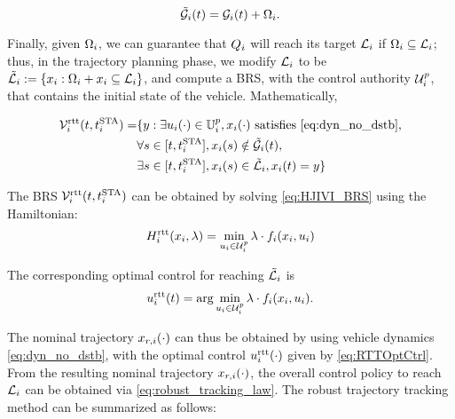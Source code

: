 \begin{equation} 
\label{eqn:rttAugObs}
\tilde{\obsset}_i(t) = \obsset_i(t) + \disckernel_i.
\end{equation}

Finally, given $\Omega_i$, we can guarantee that $Q_i$ will reach its target $\mathcal{L}_i$ if $\Omega_i \subseteq \mathcal{L}_i$; thus, in the trajectory planning phase, we modify $\mathcal{L}_i$ to be $\tilde{\mathcal{L}}_i := \{x_i: \Omega_i + x_i \subseteq \mathcal{L}_i\}$, and compute a BRS, with the control authority $\mathcal{U}^p_i$, that contains the initial state of the vehicle. Mathematically,

\begin{equation}
\label{eq:rttBRS}
\begin{aligned}
\brs_i^\text{rtt}(t, \sta_i) = & \{y: \exists \ctrl_i(\cdot) \in \cfset^p_i, \state_i(\cdot) \text{ satisfies \eqref{eq:dyn_no_dstb}},\\
&\forall s \in [t, \sta_i], \state_i(s) \notin \tilde{\obsset}_i(t), \\
& \exists s \in [t, \sta_i], \state_i(s) \in \tilde{\targetset}_i, \state_i(t) = y\}
\end{aligned}
\end{equation}

The BRS $\mathcal{V}_i^\text{rtt}(t, t^\text{STA}_i)$ can be obtained by solving \eqref{eq:HJIVI_BRS} using the Hamiltonian: 
\begin{equation}
\label{eq:RTTham}
\ham_i^\text{rtt}(\state_i, \costate) = \min_{\ctrl_i \in \cset^\pos_i } \costate \cdot \fdyn_i(\state_i, \ctrl_i)
\end{equation}

The corresponding optimal control for reaching $\tilde{\mathcal{L}}_i$ is
\begin{equation}
\label{eq:RTTOptCtrl}
\ctrl_i^\text{rtt}(t) = \arg \min_{\ctrl_i \in \cset^\pos_i } \costate \cdot \fdyn_i(\state_i, \ctrl_i).
\end{equation}

The nominal trajectory $x_{r,i}(\cdot)$ can thus be obtained by using vehicle dynamics \eqref{eq:dyn_no_dstb}, with the optimal control  $u_i^\text{rtt}(\cdot)$ given by \eqref{eq:RTTOptCtrl}. From the resulting nominal trajectory $x_{r,i}(\cdot)$, the overall control policy to reach $\mathcal{L}_i$ can be obtained via \eqref{eq:robust_tracking_law}. The robust trajectory tracking method can be summarized as follows:

